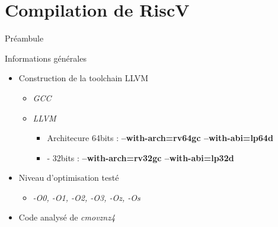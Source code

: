 \documentclass[A4,svgnames,9pt,aspectratio=169]{beamer}
\begin{document}

\section{Compilation de RiscV}
\frame{\sectionpage}

\begin{frame}{Préambule}

  \begin{block}{Informations générales}
    \begin{itemize}
      \item Construction de la toolchain LLVM
      \begin{itemize}
        \item \textit{GCC}
        \item \textit{LLVM}
        \begin{itemize}
          \item Architecure 64bits : \textbf{--with-arch=rv64gc --with-abi=lp64d}
          \item - 32bits : \textbf{--with-arch=rv32gc --with-abi=lp32d}
        \end{itemize}
      \end{itemize}
      \item Niveau d'optimisation testé
      \begin{itemize}
        \item \textit{-O0, -O1, -O2, -O3, -Oz, -Os}
      \end{itemize}
      \item Code analysé de \textit{cmovznz4}
    \end{itemize}
    
  \end{block}

\end{frame}

\end{document}
